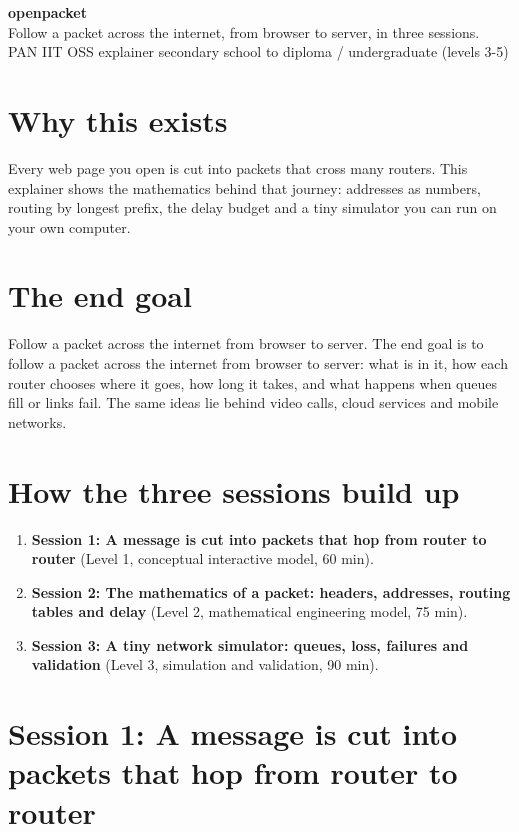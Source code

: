 \documentclass[11pt,a4paper]{article}
\begin{document}
\begin{center}{\LARGE\bfseries openpacket}\\[0.4em]{\large Follow a packet across the internet, from browser to server, in three sessions.}\\[0.2em]\small PAN IIT OSS explainer \textbullet{} secondary school to diploma / undergraduate (levels 3-5)\end{center}

\section*{Why this exists}
Every web page you open is cut into packets that cross many routers. This explainer shows the mathematics behind that journey: addresses as numbers, routing by longest prefix, the delay budget and a tiny simulator you can run on your own computer.

\section*{The end goal}
Follow a packet across the internet from browser to server. The end goal is to follow a packet across the internet from browser to server: what is in it, how each router chooses where it goes, how long it takes, and what happens when queues fill or links fail. The same ideas lie behind video calls, cloud services and mobile networks.

\section*{How the three sessions build up}
\begin{enumerate}[nosep]
\item \textbf{Session 1: A message is cut into packets that hop from router to router} (Level 1, conceptual interactive model, 60 min).
\item \textbf{Session 2: The mathematics of a packet: headers, addresses, routing tables and delay} (Level 2, mathematical engineering model, 75 min).
\item \textbf{Session 3: A tiny network simulator: queues, loss, failures and validation} (Level 3, simulation and validation, 90 min).
\end{enumerate}

\section{Session 1: A message is cut into packets that hop from router to router}
\end{document}
